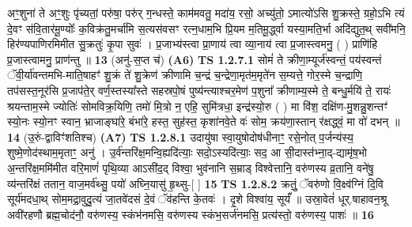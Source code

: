 \documentclass[17pt]{extarticle}
\begin{document}
                  अꣳ॒॒शुना॑ ते अꣳ॒॒शुः पृ॑च्यतां॒ परु॑षा॒ परु॑र् ग॒न्धस्ते॒ काम॑मवतु॒ मदा॑य॒ रसो॒ अच्यु॑तो॒ ऽमात्यो॑ऽसि शु॒क्रस्ते॒ ग्रहो॒ऽभि त्यं दे॒वꣳ स॑वि॒तार॑मू॒ण्योः᳚ क॒विक्र॑तु॒मर्चा॑मि स॒त्यस॑वसꣳ रत्न॒धाम॒भि प्रि॒यम म॒तिमू॒र्द्ध्वा यस्या॒मति॒र्भा अदि॑द्युत॒थ् सवी॑मनि॒ हिर॑ण्यपाणिरमिमीत सु॒क्रतुः॑ कृ॒पा सुवः॑ । प्र॒जाभ्य॑स्त्वा प्रा॒णाय॑ त्वा व्या॒नाय॑ त्वा प्र॒जास्त्वमनु॒ ( ) प्राणि॑हि प्र॒जास्त्वामनु॒ प्राण॑न्तु ॥ \textbf{  13} \newline
                  \newline
                       (अनु॑-स॒प्त च॑)  \textbf{(A6)} \newline \newline
                                        \textbf{ TS 1.2.7.1} \newline
                  सोमं॑ ते क्रीणा॒म्यूर्ज॑स्वन्तं॒ पय॑स्वन्तं ॅवी॒र्या॑वन्तमभि-माति॒षाहꣳ॑ शु॒क्रं ते॑ शु॒क्रेण॑ क्रीणामि च॒न्द्रं च॒न्द्रेणा॒मृत॑म॒मृते॑न स॒म्यत्ते॒ गोर॒स्मे च॒न्द्राणि॒ तप॑सस्त॒नूर॑सि प्र॒जाप॑ते॒र् वर्ण॒स्तस्या᳚स्ते सहस्रपो॒षं पुष्य॑न्त्याश्चर॒मेण॑ प॒शुना᳚ क्रीणाम्य॒स्मे ते॒ बन्धु॒र्मयि॑ ते॒ रायः॑ श्रयन्ताम॒स्मे ज्योतिः॑ सोमविक्र॒यिणि॒ तमो॑ मि॒त्रो न॒ एहि॒ सुमि॑त्रधा॒ इन्द्र॑स्यो॒रु ( ) मा वि॑श॒ दक्षि॑ण-मु॒शन्नु॒शन्तꣳ॑ स्यो॒नः स्यो॒नꣳ स्वान॒ भ्राजाङ्घा॑रे॒ बंभा॑रे॒ हस्त॒ सुह॑स्त॒ कृशा॑नवे॒ते वः॑ सोम॒ क्रय॑णा॒स्तान् र॑क्षद्ध्वं॒ मा वो॑ दभन् ॥ \textbf{  14 } \newline
                  \newline
                      (उ॒रुं-द्वाविꣳ॑शतिश्च)  \textbf{(A7)} \newline \newline
                                        \textbf{ TS 1.2.8.1} \newline
                  उदायु॑षा स्वा॒युषोदोष॑धीनाꣳ॒॒ रसे॒नोत् प॒र्जन्य॑स्य॒ शुष्मे॒णोद॑स्थाम॒मृताꣳ॒॒ अनु॑ । उ॒र्व॑न्तरि॑क्ष॒मन्वि॒ह्यदि॑त्याः॒ सदो॒ऽस्यदि॑त्याः॒ सद॒ आ सी॒दास्त॑भ्ना॒द्-द्यामृ॑ष॒भो अ॒न्तरि॑क्ष॒ममि॑मीत वरि॒माणं॑ पृथि॒व्या आऽसी॑द॒द् विश्वा॒ भुव॑नानि स॒म्राड् विश्वेत्तानि॒ वरु॑णस्य व्र॒तानि॒ वने॑षु॒ व्य॑न्तरि॑क्षं ततान॒ वाज॒मर्व॑थ्सु॒ पयो॑ अघ्नि॒यासु॑ हृ॒थ्सु-[ ] \textbf{  15} \newline
                  \newline
                                \textbf{ TS 1.2.8.2} \newline
                  क्रतुं॒ ॅवरु॑णो वि॒क्ष्व॑ग्निं दि॒वि सूर्य॑मदधा॒थ् सोम॒मद्रा॒वुदु॒त्यं जा॒तवे॑दसं दे॒वं ॅव॑हन्ति के॒तवः॑ । दृ॒शे विश्वा॑य॒ सूर्यं᳚ ॥ उस्रा॒वेतं॑ धूर्.षाहावन॒श्रू अवी॑रहणौ ब्रह्म॒चोद॑नौ॒ वरु॑णस्य॒ स्कंभ॑नमसि॒ वरु॑णस्य स्कंभ॒सर्ज॑नमसि॒ प्रत्य॑स्तो॒ वरु॑णस्य॒ पाशः॑ ॥ \textbf{  16 } \newline
\end{document}
